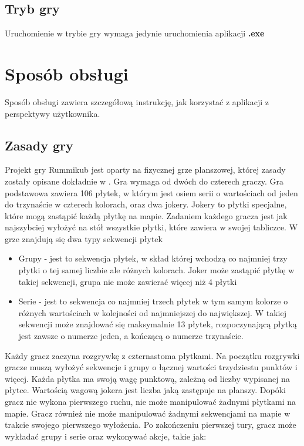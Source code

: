 \documentclass[a4paper,twoside,12pt]{book}
\begin{document}
	
	\subsection{Tryb gry}
	Uruchomienie w trybie gry wymaga jedynie uruchomienia aplikacji \textbf{.exe}
	\section{Sposób obsługi}
	Sposób obsługi zawiera szczegółową instrukcję, jak korzystać z aplikacji z perspektywy użytkownika.
	\subsection{Zasady gry}
	
	Projekt gry Rummikub jest oparty na fizycznej grze planszowej, której zasady zostały opisane dokładnie w \cite{bib:rummikub_rules}.
	Gra wymaga od dwóch do czterech graczy. Gra podstawowa zawiera 106 płytek, w którym jest osiem serii o wartościach od jeden do trzynaście w czterech kolorach, oraz dwa jokery. Jokery to płytki specjalne, które mogą zastąpić każdą płytkę na mapie. Zadaniem każdego gracza jest jak najszybciej wyłożyć na stół wszystkie płytki, które zawiera w swojej tabliczce.
	W grze znajdują się dwa typy sekwencji płytek
		\begin{itemize}
			\item Grupy - jest to sekwencja płytek, w skład której wchodzą co najmniej trzy płytki o tej samej liczbie ale różnych kolorach. Joker może zastąpić płytkę w takiej sekwencji, grupa nie może zawierać więcej niż 4 płytki
			\item Serie - jest to sekwencja co najmniej trzech płytek w tym samym kolorze o różnych wartościach w kolejności od najmniejszej do największej. W takiej sekwencji może znajdować się maksymalnie 13 płytek, rozpoczynającą płytką jest zawsze o numerze jeden, a kończącą o numerze trzynaście.
		\end{itemize}
	Każdy gracz zaczyna rozgrywkę z czternastoma płytkami. Na początku rozgrywki gracze muszą wyłożyć sekwencje i grupy o łącznej wartości trzydziestu punktów i więcej. Każda płytka ma swoją wagę punktową, zależną od liczby wypisanej na płytce. Wartością wagową jokera jest liczba jaką zastępuje na planszy. 
	Dopóki gracz nie wykona pierwszego ruchu, nie może manipulować żadnymi płytkami na mapie. Gracz również nie może manipulować żadnymi sekwencjami na mapie w trakcie swojego pierwszego wyłożenia. Po zakończeniu pierwszej tury, gracz może wykładać grupy i serie oraz wykonywać akcje, takie jak:
\end{document}

